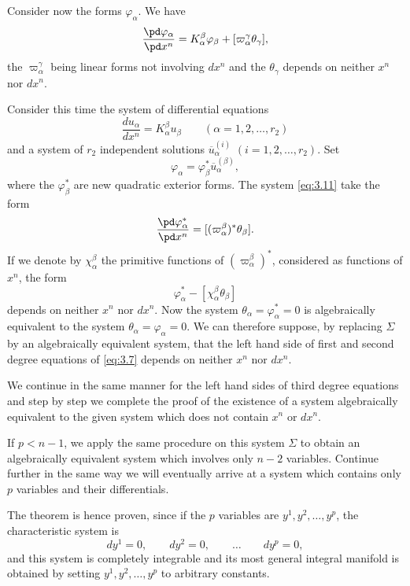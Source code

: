 Consider now the forms $\varphi_{\alpha}$. We have
\begin{equation}
  \label{eq:3.11}
  \frac{\pd \varphi_{\alpha}}{\pd x^{n}}=K^{\beta}_{\alpha}\varphi_{\beta}+[\varpi_{\alpha}^{\gamma}\theta_{\gamma}],
\end{equation}
the $\varpi_{\alpha}^{\gamma}$ being linear forms not involving $dx^{n}$ and the $\theta_{\gamma}$ depends on neither $x^{n}$ nor $dx^{n}$.

Consider this time the system of differential equations
\begin{equation}
  \label{eq:3.12}
  \frac{du_{\alpha}}{dx^{n}}=K_{\alpha}^{\beta}u_{\beta}\qquad(\alpha=1,2,\dots,r_{2})
\end{equation}
and a system of $r_{2}$ independent solutions $\overline u_{\alpha}^{(i)}$ $(i=1,2,\dots,r_{2})$. Set
\[
\varphi_{\alpha}=\varphi_{\beta}^{*}\overline u_{\alpha}^{(\beta)},
\]
where the $\varphi^{*}_{\beta}$ are new quadratic exterior forms. The system \eqref{eq:3.11} take the form
\[
\frac{\pd \varphi_{\alpha}^{*}}{\pd x^{n}}=[(\varpi_{\alpha}^{\beta})^{*}\theta_{\beta}].
\]
If we denote by $\chi_{\alpha}^{\beta}$ the primitive functions of $(\varpi_{\alpha}^{\beta})^{*}$, considered as functions of $x^{n}$,  the form
\[
\varphi_{\alpha}^{*}-[\chi_{\alpha}^{\beta}\theta_{\beta}]
\]
depends on neither $x^{n}$ nor $dx^{n}$. Now the system $\theta_{\alpha}=\varphi_{\alpha}^{*}=0$ is algebraically equivalent to the system $\theta_{\alpha}=\varphi_{\alpha}=0$. We can therefore suppose, by replacing $\Sigma$ by an algebraically equivalent system, that the left hand side of first and second degree equations of \eqref{eq:3.7} depends on neither $x^{n}$ nor $dx^{n}$.

We continue in the same manner for the left hand sides of  third degree equations and step by step we complete the proof of the existence of a system algebraically equivalent to the given system which does not contain $x^{n}$ or $dx^{n}$.

If $p<n-1$, we apply the same procedure on this system $\Sigma$ to obtain an algebraically equivalent system which involves only $n-2$ variables. Continue further in the same way we will eventually arrive at a system which contains only $p$ variables and their differentials.

The theorem is hence proven, since if the $p$ variables are $y^{1},y^{2},\dots,y^{p}$, the characteristic system is
\[
dy^{1}=0,\qquad dy^{2}=0,\qquad \dots\qquad dy^{p}=0,
\]
and this system is completely integrable and its most general integral manifold is obtained by setting $y^{1},y^{2},\dots,y^{p}$ to arbitrary constants.


